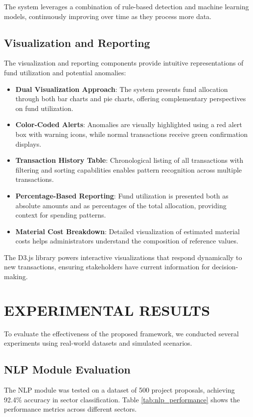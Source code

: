 \documentclass[12pt,a4paper]{report}
\begin{document}
\noindent The system leverages a combination of rule-based detection and machine learning models, continuously improving over time as they process more data.


\section{Visualization and Reporting}
\indent \indent The visualization and reporting components provide intuitive representations of fund utilization and potential anomalies:

\begin{itemize}
    \item \textbf{Dual Visualization Approach}: The system presents fund allocation through both bar charts and pie charts, offering complementary perspectives on fund utilization.
    \item \textbf{Color-Coded Alerts}: Anomalies are visually highlighted using a red alert box with warning icons, while normal transactions receive green confirmation displays.
    \item \textbf{Transaction History Table}: Chronological listing of all transactions with filtering and sorting capabilities enables pattern recognition across multiple transactions.
    \item \textbf{Percentage-Based Reporting}: Fund utilization is presented both as absolute amounts and as percentages of the total allocation, providing context for spending patterns.
    \item \textbf{Material Cost Breakdown}: Detailed visualization of estimated material costs helps administrators understand the composition of reference values.
\end{itemize}

\noindent The D3.js library powers interactive visualizations that respond dynamically to new transactions, ensuring stakeholders have current information for decision-making.


\chapter{EXPERIMENTAL RESULTS}
\indent \indent To evaluate the effectiveness of the proposed framework, we conducted several experiments using real-world datasets and simulated scenarios.

\section{NLP Module Evaluation}
\indent \indent The NLP module was tested on a dataset of 500 project proposals, achieving 92.4\% accuracy in sector classification. Table \ref{tab:nlp_performance} shows the performance metrics across different sectors.
\end{document}
